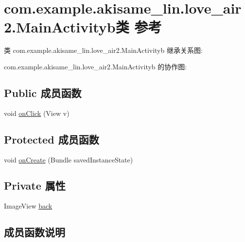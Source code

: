 \hypertarget{classcom_1_1example_1_1akisame__lin_1_1love__air2_1_1_main_activityb}{}\section{com.\+example.\+akisame\+\_\+lin.\+love\+\_\+air2.\+Main\+Activityb类 参考}
\label{classcom_1_1example_1_1akisame__lin_1_1love__air2_1_1_main_activityb}


类 com.\+example.\+akisame\+\_\+lin.\+love\+\_\+air2.\+Main\+Activityb 继承关系图\+:


com.\+example.\+akisame\+\_\+lin.\+love\+\_\+air2.\+Main\+Activityb 的协作图\+:
\subsection*{Public 成员函数}
\begin{DoxyCompactItemize}
\item 
void \mbox{\hyperlink{classcom_1_1example_1_1akisame__lin_1_1love__air2_1_1_main_activityb_a6c55d064cdfbe474ead6b1052c74e94d}{on\+Click}} (View v)
\end{DoxyCompactItemize}
\subsection*{Protected 成员函数}
\begin{DoxyCompactItemize}
\item 
void \mbox{\hyperlink{classcom_1_1example_1_1akisame__lin_1_1love__air2_1_1_main_activityb_a4cdb50551d33f3b3e97e90c3cf49e66c}{on\+Create}} (Bundle saved\+Instance\+State)
\end{DoxyCompactItemize}
\subsection*{Private 属性}
\begin{DoxyCompactItemize}
\item 
Image\+View \mbox{\hyperlink{classcom_1_1example_1_1akisame__lin_1_1love__air2_1_1_main_activityb_afc67d8cc5f5a32738e5a36168df78bdf}{back}}
\end{DoxyCompactItemize}


\subsection{成员函数说明}
\mbox{\label{classcom_1_1example_1_1akisame__lin_1_1love__air2_1_1_main_activityb_a6c55d064cdfbe474ead6b1052c74e94d}} 
